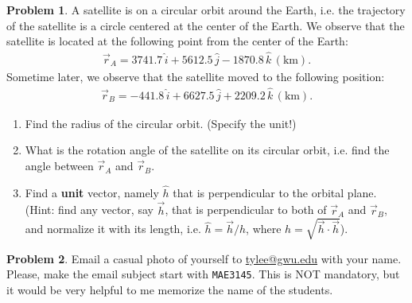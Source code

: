 \documentclass[10pt]{article}
\renewcommand{\baselinestretch}{1.2}
\theoremstyle{definition}
\newtheorem{prob}{Problem}[section]
\newenvironment{subprob}%
{\renewcommand{\theenumi}{\alph{enumi}}\renewcommand{\labelenumi}{(\theenumi)}\begin{enumerate}}%
{\end{enumerate}}%
\begin{document}
\begin{prob}
A satellite is on a circular orbit around the Earth, i.e. the trajectory of the satellite is a circle centered at the center of the Earth. We observe that the satellite is located at the following point from the center of the Earth:
\begin{align*}
\vec r_A = 3741.7\,\hat i +    5612.5\, \hat j  -1870.8\,\hat k\,(\mathrm{km}).
\end{align*}
Sometime later, we observe that the satellite moved to the following position:
\begin{align*}
\vec r_B = -441.8\,\hat i +    6627.5\, \hat j +2209.2\,\hat k\,(\mathrm{km}).
\end{align*}

\begin{subprob}
\item Find the radius of the circular orbit. (Specify the unit!)
\item What is the rotation angle of the satellite on its circular orbit, i.e. find the angle between $\vec r_A$ and $\vec r_B$.
\item Find a \textbf{unit} vector, namely $\hat h$ that is perpendicular to the orbital plane. (Hint: find any vector, say $\vec h$, that is perpendicular to both of $\vec r_A$ and $\vec r_B$, and normalize it with its length, i.e. $\hat h = \vec h / h$, where $h=\sqrt{\vec h \cdot \vec h}$).
\end{subprob}

\end{prob}


\begin{prob}
Email a casual photo of yourself to \url{tylee@gwu.edu} with your name. Please, make the email subject start with \texttt{MAE3145}.  This is NOT mandatory, but it would be very helpful to me memorize the name of the students. 
\end{prob}

%
%
%
%
\end{document}

